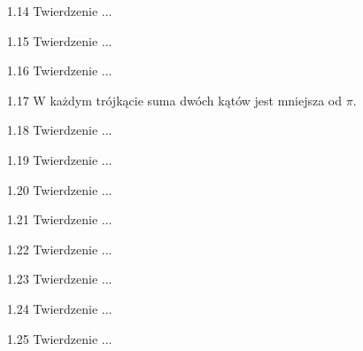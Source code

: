 \begin{enumerate}
    \item [1.14] Twierdzenie ... %
    \item [1.15] Twierdzenie ... %
    \item [1.16] Twierdzenie ... %
    \item [1.17] W każdym trójkącie suma dwóch kątów jest mniejsza od $\pi$.
    \item [1.18] Twierdzenie ... %
    \item [1.19] Twierdzenie ... %
    \item [1.20] Twierdzenie ... %
    \item [1.21] Twierdzenie ... %
    \item [1.22] Twierdzenie ... %
    \item [1.23] Twierdzenie ... %
    \item [1.24] Twierdzenie ... %
    \item [1.25] Twierdzenie ... %

\end{enumerate}
